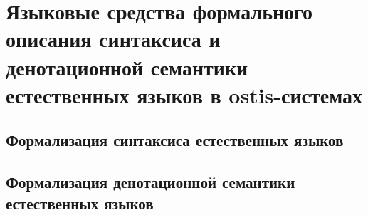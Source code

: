 \chapter{Языковые средства формального описания синтаксиса и денотационной семантики естественных языков в ostis-системах}
\label{chapter_lang}


\section{Формализация синтаксиса естественных языков}
\section{Формализация денотационной семантики естественных языков}

%